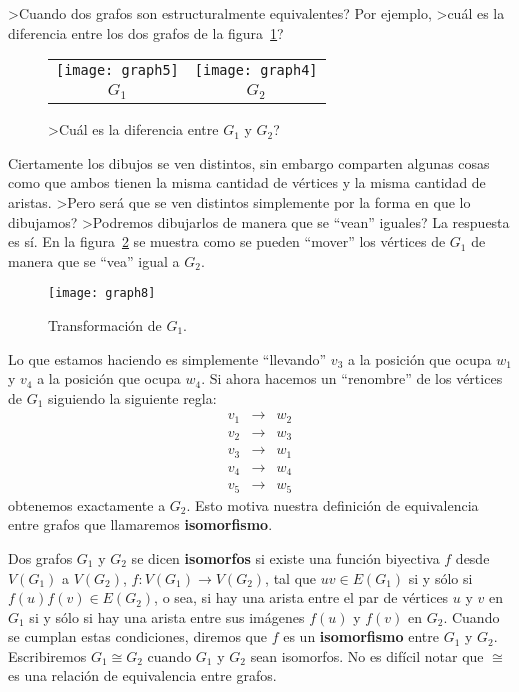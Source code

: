 >Cuando dos grafos son estructuralmente equivalentes?
Por ejemplo, >cuál es la diferencia entre los dos grafos de la figura~\ref{fig:compare-graph}?
\begin{figure}[t!]
\centering
\begin{tabular}{cc}
\texttt{[image: graph5]}\hspace*{3em} & \hspace*{3em}\texttt{[image: graph4]} \\
$G_1$ \hspace*{3em} & \hspace*{3em} $G_2$
\end{tabular}
\caption{>Cuál es la diferencia entre $G_1$ y $G_2$?}
\label{fig:compare-graph}
\end{figure}
Ciertamente los dibujos se ven distintos, sin embargo comparten algunas cosas como que ambos tienen la misma cantidad de vértices y la misma cantidad de aristas.
>Pero será que se ven distintos simplemente por la forma en que lo dibujamos?
>Podremos dibujarlos de manera que se ``vean'' iguales?
La respuesta es sí.
En la figura~\ref{fig:transform} se muestra como se pueden ``mover'' los vértices de $G_1$ de manera que se ``vea'' igual a $G_2$.
\begin{figure}[t!]
\centering
\texttt{[image: graph8]}\\
\caption{Transformación de $G_1$.}
\label{fig:transform}
\end{figure}
Lo que estamos haciendo es simplemente ``llevando'' $v_3$ a la posición que ocupa $w_1$ y $v_4$ a la posición que ocupa $w_4$.
Si ahora hacemos un ``renombre'' de los vértices de $G_1$ siguiendo la siguiente regla:
\[
\begin{array}{ccc}
v_1 & \rightarrow & w_2 \\
v_2 & \rightarrow & w_3 \\
v_3 & \rightarrow & w_1 \\
v_4 & \rightarrow & w_4 \\
v_5 & \rightarrow & w_5
\end{array}
\]
obtenemos exactamente a $G_2$.
Esto motiva nuestra definición de equivalencia entre grafos que llamaremos {\bf isomorfismo}.

\begin{definicion}
Dos grafos $G_1$ y $G_2$ se dicen {\bf isomorfos} si existe una función biyectiva $f$ desde $V(G_1)$ a $V(G_2)$, $f:V(G_1)\rightarrow V(G_2)$, tal que $uv\in E(G_1)$ si y sólo si $f(u)f(v)\in E(G_2)$, o sea, si hay una arista entre el par de vértices $u$ y $v$ en $G_1$ si y sólo si hay una arista entre sus imágenes $f(u)$ y $f(v)$ en $G_2$.
Cuando se cumplan estas condiciones, diremos que $f$ es un {\bf isomorfismo} entre $G_1$ y $G_2$.
Escribiremos $G_1\cong G_2$ cuando $G_1$ y $G_2$ sean isomorfos.
No es difícil notar que $\cong$ es una relación de equivalencia entre grafos.
\end{definicion}

